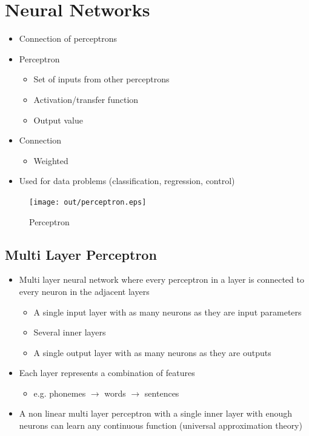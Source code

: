 \documentclass[a4paper]{article}
\begin{document}
\section{Neural Networks}
\label{sec:nn}

\begin{itemize}
  \item Connection of perceptrons
  \item Perceptron
    \begin{itemize}
      \item Set of inputs from other perceptrons
      \item Activation/transfer function
      \item Output value
    \end{itemize}
  \item Connection
    \begin{itemize}
      \item Weighted
    \end{itemize}
  \item Used for data problems (classification, regression, control)
\end{itemize}

\begin{figure}[h!]
  \centering
  \texttt{[image: out/perceptron.eps]}
  \caption{Perceptron}
  \label{fig:perceptron}
\end{figure}
\FloatBarrier

\subsection{Multi Layer Perceptron}

\begin{itemize}
  \item Multi layer neural network where every perceptron in a layer is
        connected to every neuron in the adjacent layers
    \begin{itemize}
      \item A single input layer with as many neurons as they are input
            parameters
      \item Several inner layers
      \item A single output layer with as many neurons as they are outputs
    \end{itemize}
  \item Each layer represents a combination of features
    \begin{itemize}
      \item e.g. phonemes $\rightarrow$ words $\rightarrow$ sentences
    \end{itemize}
  \item A non linear multi layer perceptron with a single inner layer with
        enough neurons can learn any continuous function (universal
        approximation theory)
\end{itemize}
\end{document}
